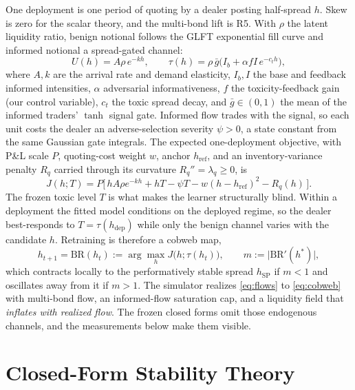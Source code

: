 \documentclass[sigconf,anonymous,review]{acmart}
\newcommand{\BR}{\mathrm{BR}}
\newcommand{\hSP}{h_{\mathrm{SP}}}
\newcommand{\hRef}{h_{\mathrm{ref}}}  %
\newcommand{\gbar}{\bar{g}}
\begin{document}
One deployment is one period of quoting by a dealer posting half-spread $h$.
Skew is zero for the scalar theory, and the multi-bond lift is R5. With
$\rho$ the latent liquidity ratio, benign notional follows the GLFT
exponential fill curve \cite{avellaneda2008highfrequency,gueant2013dealing}
and informed notional a spread-gated channel:
\begin{equation}
U(h)=A\rho\,e^{-kh},\qquad
\tau(h)=\rho\,\gbar\big(I_b+\alpha f I\,e^{-c_t h}\big),
\label{eq:flows}
\end{equation}
where $A,k$ are the arrival rate and demand elasticity, $I_b,I$ the base and
feedback informed intensities, $\alpha$ adversarial informativeness, $f$ the
toxicity-feedback gain (our control variable), $c_t$ the toxic spread decay,
and $\gbar\in(0,1)$ the mean of the informed traders' $\tanh$ signal gate.
Informed flow trades with the signal, so each unit costs the dealer an
adverse-selection severity $\psi>0$, a state constant from the same Gaussian
gate integrals. The expected one-deployment objective, with P\&L scale $P$,
quoting-cost weight $w$, anchor $\hRef$, and an inventory-variance penalty
$R_q$ carried through its curvature $R_q''=\lambda_q\ge0$, is
\begin{equation}
J(h;T)=P\big[\,hA\rho e^{-kh}+hT-\psi T-w(h-\hRef)^2-R_q(h)\,\big].
\label{eq:objective}
\end{equation}
The frozen toxic level $T$ is what makes the learner structurally blind.
Within a deployment the fitted model conditions on the deployed regime, so
the dealer best-responds to $T=\tau(h_{\mathrm{dep}})$ while only the benign
channel varies with the candidate $h$. Retraining is therefore a cobweb map,
\begin{equation}
h_{t+1}=\BR(h_t):=\arg\max_h J\big(h;\tau(h_t)\big),\qquad
m:=\big|\BR'(h^*)\big|,
\label{eq:cobweb}
\end{equation}
which contracts locally to the performatively stable spread $\hSP$ if $m<1$
and oscillates away from it if $m>1$. The simulator realizes \eqref{eq:flows} to \eqref{eq:cobweb} with
multi-bond flow, an informed-flow saturation cap, and a liquidity field that
\emph{inflates with realized flow}. The frozen closed forms omit those
endogenous channels, and the measurements below make them visible.

\section{Closed-Form Stability Theory}
\label{sec:theory}
\end{document}
